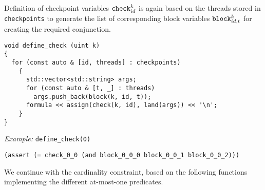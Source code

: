 \noindent
Definition of checkpoint variables $\texttt{check}^k_{id}$ is again based on the threads stored in \texttt{checkpoints} to generate the list of corresponding block variables $\texttt{block}^k_{id, t}$ for creating the required conjunction.

\begin{lstlisting}[style=c++]
void define_check (uint k)
{
  for (const auto & [id, threads] : checkpoints)
    {
      std::vector<std::string> args;
      for (const auto & [t, _] : threads)
        args.push_back(block(k, id, t));
      formula << assign(check(k, id), land(args)) << '\n';
    }
}
\end{lstlisting}


\noindent
\emph{Example:} \lstinline[style=c++]{define_check(0)}

\begin{lstlisting}[language=smtlib]
(assert (= check_0_0 (and block_0_0_0 block_0_0_1 block_0_0_2)))
\end{lstlisting}


%
%

\noindent
We continue with the cardinality constraint, based on the following functions implementing the different at-most-one predicates.

